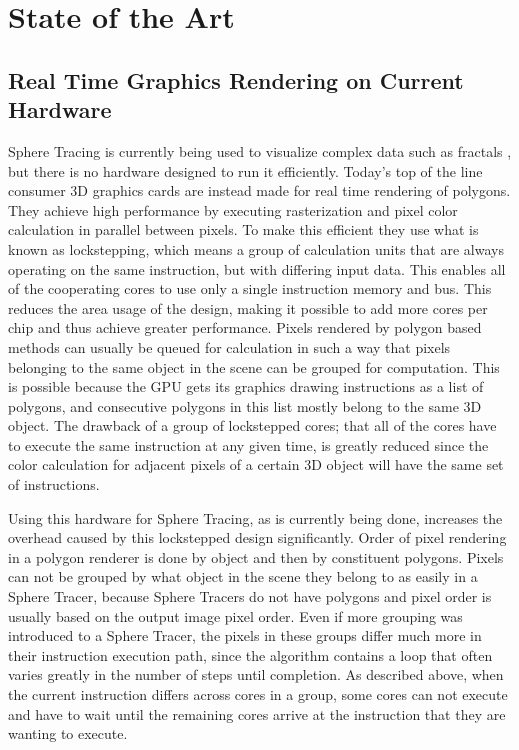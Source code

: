 \chapter{State of the Art}

	\section{ Real Time Graphics Rendering on Current Hardware } 

		Sphere Tracing is currently being used to visualize complex data such
		as fractals \cite{JONATHANGRANSKOG2017}, but there is no hardware
		designed to run	it efficiently. Today's top of the line consumer 3D
		graphics cards are instead made for real time rendering of
		polygons\cite{Houston2010}. They achieve high performance by
		executing rasterization and pixel color calculation in parallel
		between pixels. To make this efficient they use what is known as
		lockstepping, which means a group of calculation units that are
		always operating on the same instruction, but with differing input
		data. This enables all of the cooperating cores to use only a single
		instruction memory and bus. This reduces the area usage of the
		design, making it possible to add more cores per chip and thus
		achieve greater performance. Pixels rendered by polygon based methods
		can usually be queued for calculation in such a way that pixels
		belonging to the same object in the scene can be grouped for
		computation. This is possible because the GPU gets its graphics
		drawing instructions as a list of polygons, and consecutive polygons
		in this list mostly belong to the same 3D object. The drawback of a
		group of lockstepped cores; that all of the cores have to execute the
		same instruction at any given time, is greatly reduced since the
		color calculation for adjacent pixels of a certain 3D object will
		have the same set of instructions.
		
		Using this hardware for Sphere Tracing, as is currently being done,
		increases the overhead caused by this lockstepped design significantly.
		Order of pixel rendering in a polygon renderer is done by object and
		then by constituent polygons. Pixels can not be grouped by what object
		in the scene they belong to as easily in a Sphere Tracer, because Sphere
		Tracers do not have polygons and pixel order is usually based on the
		output image pixel order. Even if more grouping was introduced to a
		Sphere Tracer, the pixels in these groups differ much more in their
		instruction execution path, since the algorithm contains a loop that
		often varies greatly in the number of steps until completion. As
		described above, when the current instruction differs across cores in a
		group, some cores can not execute and have to wait until the remaining
		cores arrive at the instruction that they are wanting to execute.
		
